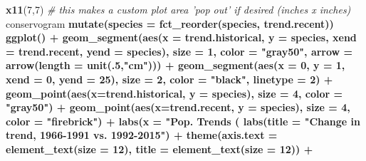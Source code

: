 \documentclass[]{article}
\newenvironment{Shaded}{\begin{snugshade}}{\end{snugshade}}
\newcommand{\KeywordTok}[1]{\textcolor[rgb]{0.13,0.29,0.53}{\textbf{#1}}}
\newcommand{\DataTypeTok}[1]{\textcolor[rgb]{0.13,0.29,0.53}{#1}}
\newcommand{\DecValTok}[1]{\textcolor[rgb]{0.00,0.00,0.81}{#1}}
\newcommand{\StringTok}[1]{\textcolor[rgb]{0.31,0.60,0.02}{#1}}
\newcommand{\CommentTok}[1]{\textcolor[rgb]{0.56,0.35,0.01}{\textit{#1}}}
\newcommand{\OperatorTok}[1]{\textcolor[rgb]{0.81,0.36,0.00}{\textbf{#1}}}
\newcommand{\NormalTok}[1]{#1}
\begin{document}
\begin{Shaded}
\begin{Highlighting}[]
\KeywordTok{x11}\NormalTok{(}\DecValTok{7}\NormalTok{,}\DecValTok{7}\NormalTok{) }\CommentTok{# this makes a custom plot area 'pop out' if desired (inches x inches)}
\NormalTok{conservogram }\OperatorTok{%>%}
\StringTok{  }\KeywordTok{mutate}\NormalTok{(}\DataTypeTok{species =} \KeywordTok{fct_reorder}\NormalTok{(species, trend.recent)) }\OperatorTok{%>%}
\StringTok{  }\KeywordTok{ggplot}\NormalTok{() }\OperatorTok{+}
\StringTok{  }\KeywordTok{geom_segment}\NormalTok{(}\KeywordTok{aes}\NormalTok{(}\DataTypeTok{x =}\NormalTok{ trend.historical, }\DataTypeTok{y =}\NormalTok{ species, }\DataTypeTok{xend =}\NormalTok{ trend.recent, }\DataTypeTok{yend =}\NormalTok{ species), }\DataTypeTok{size =} \DecValTok{1}\NormalTok{, }
               \DataTypeTok{color =} \StringTok{"gray50"}\NormalTok{, }\DataTypeTok{arrow =} \KeywordTok{arrow}\NormalTok{(}\DataTypeTok{length =} \KeywordTok{unit}\NormalTok{(.}\DecValTok{5}\NormalTok{,}\StringTok{"cm"}\NormalTok{))) }\OperatorTok{+}
\StringTok{  }\KeywordTok{geom_segment}\NormalTok{(}\KeywordTok{aes}\NormalTok{(}\DataTypeTok{x =} \DecValTok{0}\NormalTok{, }\DataTypeTok{y =} \DecValTok{1}\NormalTok{, }\DataTypeTok{xend =} \DecValTok{0}\NormalTok{, }\DataTypeTok{yend =} \DecValTok{25}\NormalTok{), }\DataTypeTok{size =} \DecValTok{2}\NormalTok{, }\DataTypeTok{color =} \StringTok{"black"}\NormalTok{, }\DataTypeTok{linetype =} \DecValTok{2}\NormalTok{) }\OperatorTok{+}
\StringTok{  }\KeywordTok{geom_point}\NormalTok{(}\KeywordTok{aes}\NormalTok{(}\DataTypeTok{x=}\NormalTok{trend.historical, }\DataTypeTok{y =}\NormalTok{ species), }\DataTypeTok{size =} \DecValTok{4}\NormalTok{, }\DataTypeTok{color =} \StringTok{"gray50"}\NormalTok{) }\OperatorTok{+}
\StringTok{  }\KeywordTok{geom_point}\NormalTok{(}\KeywordTok{aes}\NormalTok{(}\DataTypeTok{x=}\NormalTok{trend.recent, }\DataTypeTok{y =}\NormalTok{ species), }\DataTypeTok{size =} \DecValTok{4}\NormalTok{, }\DataTypeTok{color =} \StringTok{"firebrick"}\NormalTok{) }\OperatorTok{+}
\StringTok{  }\KeywordTok{labs}\NormalTok{(}\DataTypeTok{x =} \StringTok{"Pop. Trends (% change per year)"}\NormalTok{, }\DataTypeTok{y =} \StringTok{""}\NormalTok{) }\OperatorTok{+}
\StringTok{  }\KeywordTok{labs}\NormalTok{(}\DataTypeTok{title =} \StringTok{"Change in trend, 1966-1991 vs. 1992-2015"}\NormalTok{) }\OperatorTok{+}
\StringTok{  }\KeywordTok{theme}\NormalTok{(}\DataTypeTok{axis.text =} \KeywordTok{element_text}\NormalTok{(}\DataTypeTok{size =} \DecValTok{12}\NormalTok{), }\DataTypeTok{title =} \KeywordTok{element_text}\NormalTok{(}\DataTypeTok{size =} \DecValTok{12}\NormalTok{)) }\OperatorTok{+}
}}}
\end{Highlighting}
\end{Shaded}
\end{document}

